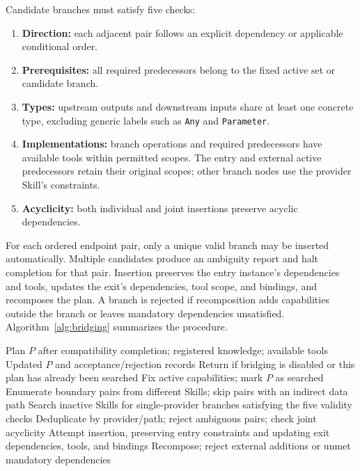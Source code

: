 Candidate branches must satisfy five checks:
\begin{enumerate}
\item \textbf{Direction:} each adjacent pair follows an explicit dependency or applicable conditional order.
\item \textbf{Prerequisites:} all required predecessors belong to the fixed active set or candidate branch.
\item \textbf{Types:} upstream outputs and downstream inputs share at least one concrete type, excluding generic labels such as \texttt{Any} and \texttt{Parameter}.
\item \textbf{Implementations:} branch operations and required predecessors have available tools within permitted scopes. The entry and external active predecessors retain their original scopes; other branch nodes use the provider Skill's constraints.
\item \textbf{Acyclicity:} both individual and joint insertions preserve acyclic dependencies.
\end{enumerate}
For each ordered endpoint pair, only a unique valid branch may be inserted automatically. Multiple candidates produce an ambiguity report and halt completion for that pair. Insertion preserves the entry instance's dependencies and tools, updates the exit's dependencies, tool scope, and bindings, and recomposes the plan. A branch is rejected if recomposition adds capabilities outside the branch or leaves mandatory dependencies unsatisfied. Algorithm~\ref{alg:bridging} summarizes the procedure.

\begin{algorithm}[t]
\caption{Directed Bridging from a Single Provider}
\label{alg:bridging}
\begin{algorithmic}[1]
\Require Plan $P$ after compatibility completion; registered knowledge; available tools
\Ensure Updated $P$ and acceptance/rejection records
\State Return if bridging is disabled or this plan has already been searched
\State Fix active capabilities; mark $P$ as searched
\State Enumerate boundary pairs from different Skills; skip pairs with an indirect data path
\State Search inactive Skills for single-provider branches satisfying the five validity checks
\State Deduplicate by provider/path; reject ambiguous pairs; check joint acyclicity
\State Attempt insertion, preserving entry constraints and updating exit dependencies, tools, and bindings
\State Recompose; reject external additions or unmet mandatory dependencies
\end{algorithmic}
\end{algorithm}


